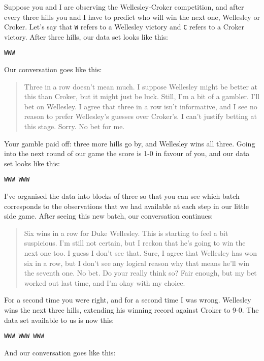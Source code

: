 Suppose you and I are observing the Wellesley-Croker competition, and after every three hills you and I have to predict who will win the next one, Wellesley or Croker. Let's say that \texttt{W} refers to a Wellesley victory and \texttt{C} refers to a Croker victory. After three hills, our data set looks like this:
\begin{verbatim}
WWW
\end{verbatim}
Our conversation goes like this:
\begin{quote}
\begin{dialogue}
 Three in a row doesn't mean much. I suppose Wellesley might be better at this than Croker, but it might just be luck. Still, I'm a bit of a gambler. I'll bet on Wellesley.
 I agree that three in a row isn't informative, and I see no reason to prefer Wellesley's guesses over Croker's. I can't justify betting at this stage. Sorry. No bet for me.
\end{dialogue}
\end{quote}
Your gamble paid off: three more hills go by, and Wellesley wins all three. Going into the next round of our game the score is 1-0 in favour of you, and our data set looks like this:
\begin{verbatim}
WWW WWW
\end{verbatim}
I've organised the data into blocks of three so that you can see which batch corresponds to the observations that we had available at each step in our little side game. After seeing this new batch, our conversation continues:
\begin{quote}
\begin{dialogue}
 Six wins in a row for Duke Wellesley. This is starting to feel a bit suspicious. I'm still not certain, but I reckon that he's going to win the next one too.
 I guess I don't see that. Sure, I agree that Wellesley has won six in a row, but I don't see any logical reason why that means he'll win the seventh one. No bet.
 Do your really think so? Fair enough, but my bet worked out last time, and I'm okay with my choice.
\end{dialogue}
\end{quote}
For a second time you were right, and for a second time I was wrong. Wellesley wins the next three hills, extending his winning record against Croker to 9-0. The data set available to us is now this: 
\begin{verbatim}
WWW WWW WWW
\end{verbatim}
And our conversation goes like this:
